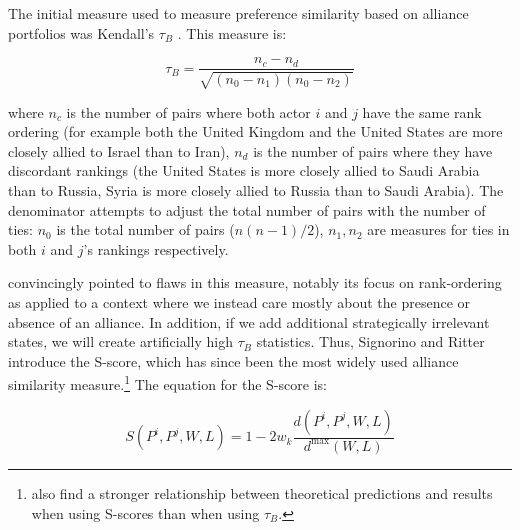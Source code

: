  The initial measure used to measure preference similarity based on alliance portfolios was Kendall's $\tau_{B}$ \citep{buenodemesquita:lalman:2008}. This measure is:
 
 \begin{equation}
	 \tau_{B} = \frac{n_{c} - n_{d}}{\sqrt{(n_{0} - n_{1})(n_{0} - n_{2})}}
 \end{equation}
 
 \noindent where $n_{c}$ is the number of pairs where both actor $i$ and $j$ have the same rank ordering (for example both the United Kingdom and the United States are more closely allied to Israel than to Iran), $n_{d}$ is the number of pairs where they have discordant rankings (the United States is more closely allied to Saudi Arabia than to Russia, Syria is more closely allied to Russia than to Saudi Arabia). The denominator attempts to adjust the total number of pairs with the number of ties: $n_{0}$ is the total number of pairs ($n(n-1)/2$), $n_{1}, n_{2}$ are measures for ties in both $i$ and $j$'s rankings respectively.
 
\citet{signorino:ritter:1999} convincingly pointed to flaws in this measure, notably its focus on rank-ordering as applied to a context where we instead care mostly about the presence or absence of an alliance. In addition, if we add additional strategically irrelevant states, we will create artificially high $\tau_{B}$ statistics. Thus, Signorino and Ritter introduce the S-score, which has since been the most widely used alliance similarity measure.\footnote{\citet{bennett:rupert:2003} also find a stronger relationship between theoretical predictions and results when using S-scores than when using $\tau_{B}$.} The equation for the S-score is:

\begin{equation}
	S(P^i, P^j, W, L) = 1 - 2w_k \frac{d(P^i, P^j, W, L)}{d^{\text{max}}(W,L)}
\end{equation}

